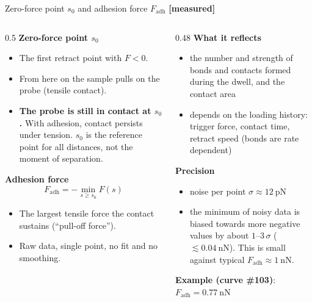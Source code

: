 \documentclass[aspectratio=169,9pt]{beamer}
\newcommand{\tagM}{\textcolor{cGreen}{\textbf{[measured]}}}
\begin{document}
\begin{frame}{Zero-force point $s_0$ and adhesion force $F_\text{adh}$ \tagM}
\begin{columns}[T]
\begin{column}{0.5\textwidth}\small
\textbf{Zero-force point $s_0$}
\begin{itemize}
\item The first retract point with $F<0$.
\item From here on the sample pulls on the probe (tensile contact).
\item \textbf{The probe is still in contact at $s_0$.} With adhesion, contact persists under tension. $s_0$ is the reference point for all distances, not the moment of separation.
\end{itemize}
\textbf{Adhesion force}
\[F_\text{adh}=-\min_{s\ge s_0}F(s)\]
\begin{itemize}
\item The largest tensile force the contact sustains (``pull-off force'').
\item Raw data, single point, no fit and no smoothing.
\end{itemize}
\end{column}
\begin{column}{0.48\textwidth}\small
\textbf{What it reflects}
\begin{itemize}
\item the number and strength of bonds and contacts formed during the dwell, and the contact area
\item depends on the loading history: trigger force, contact time, retract speed (bonds are rate dependent)
\end{itemize}
\textbf{Precision}
\begin{itemize}
\item noise per point $\sigma\approx\SI{12}{\pico\newton}$
\item the minimum of noisy data is biased towards more negative values by about $1$--$3\,\sigma$ ($\lesssim\SI{0.04}{\nano\newton}$). This is small against typical $F_\text{adh}\approx\SI{1}{\nano\newton}$.
\end{itemize}
\textbf{Example (curve \#103)}: $F_\text{adh}=\SI{0.77}{\nano\newton}$
\end{column}
\end{columns}
\end{frame}
\end{document}
